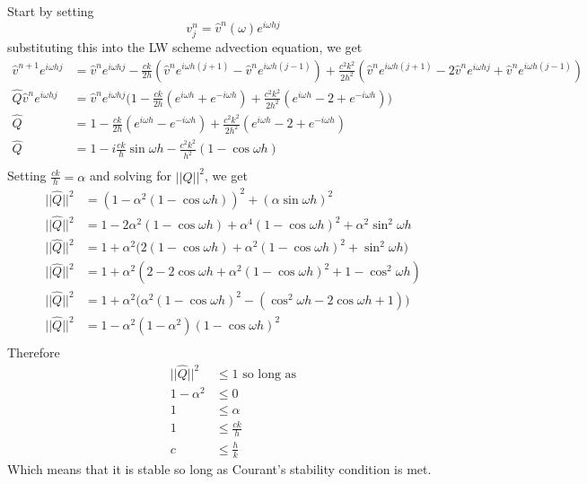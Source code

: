 \\
\\
Start by setting
\begin{equation*}
  v^n_j = \hat{v}^n(\omega)e^{i\omega hj}
\end{equation*}
substituting this into the LW scheme advection equation, we get
\begin{equation*}
\begin{align}
  \hat{v}^{n+1}e^{i\omega hj} &= \hat{v}^ne^{i\omega hj}-\frac{ck}{2h}(\hat{v}^ne^{i\omega h(j+1)} - \hat{v}^ne^{i\omega h(j-1)}) + \frac{c^2k^2}{2h^2}(\hat{v}^ne^{i\omega h(j+1)} -2\hat{v}^ne^{i\omega hj} + \hat{v}^ne^{i\omega h(j-1)}) \\
  \hat{Q}\hat{v}^ne^{i\omega hj} &= \hat{v}^ne^{i\omega hj} \big(1 - \frac{ck}{2h}(e^{i\omega h}+e^{-i\omega h}) + \frac{c^2k^2}{2h^2}(e^{i\omega h} -2+ e^{-i\omega h})\big)\\
  \hat{Q} &= 1 - \frac{ck}{2h}(e^{i\omega h}-e^{-i\omega h}) + \frac{c^2k^2}{2h^2}(e^{i\omega h} -2+ e^{-i\omega h})\\
  \hat{Q} &= 1 - i\frac{ck}{h}\sin\omega h - \frac{c^2k^2}{h^2}(1 - \cos\omega h)\\
\end{align}
\end{equation*}
Setting $\frac{ck}{h}=\alpha$ and solving for $||\hat{Q}||^2$, we get
\begin{equation*}
\begin{align}
  ||\hat{Q}||^2 &= (1 - \alpha^2(1 - \cos\omega h))^2 + (\alpha\sin\omega h)^2\\
  ||\hat{Q}||^2 &= 1 - 2\alpha^2(1 - \cos\omega h) + \alpha^4(1 - \cos\omega h)^2 + \alpha^2\sin^2\omega h\\
  ||\hat{Q}||^2 &= 1 + \alpha^2 \big( 2(1 - \cos\omega h) + \alpha^2(1 - \cos\omega h)^2 + \sin^2\omega h \big)\\
  ||\hat{Q}||^2 &= 1 + \alpha^2 ( 2 - 2\cos\omega h + \alpha^2(1 - \cos\omega h)^2 + 1 -\cos^2\omega h )\\
  ||\hat{Q}||^2 &= 1 + \alpha^2 \big( \alpha^2(1 - \cos\omega h)^2 - (\cos^2\omega h - 2\cos\omega h + 1) \big)\\
  ||\hat{Q}||^2 &= 1 - \alpha^2 (1 - \alpha^2)(1 - \cos\omega h)^2\\
\end{align}
\end{equation*}
Therefore
\begin{equation*}
\begin{align}
  ||\hat{Q}||^2 &\leq 1 \text{ so long as}\\
  1- \alpha^2 	&\leq 0 \\
  1	 	&\leq \alpha \\
  1		&\leq \frac{ck}{h} \\
  c		&\leq \frac{h}{k}
\end{align}
\end{equation*}
Which means that it is stable so long as Courant's stability condition is met.
